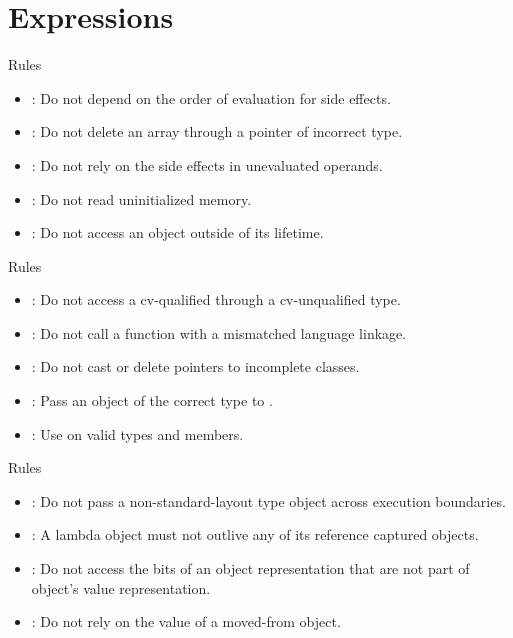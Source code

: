 \section{Expressions}

\begin{frame}[t]{Rules}
\begin{itemize}
  \item {}: 
        Do not depend on the order of evaluation for side effects.
  \vfill
  \item {}: 
        Do not delete an array through a pointer of incorrect type.
  \vfill
  \item {}: 
        Do not rely on the side effects in unevaluated operands.
  \vfill
  \item {}:
        Do not read uninitialized memory.
  \vfill
  \item {}:
        Do not access an object outside of its lifetime. 
\end{itemize}
\end{frame}

\begin{frame}[t]{Rules}
\begin{itemize}
  \item {}:
        Do not access a cv-qualified through a cv-unqualified type. 
  \vfill
  \item {}:
        Do not call a function with a mismatched language linkage. 
  \vfill
  \item {}: 
        Do not cast or delete pointers to incomplete classes.
  \vfill
  \item {}:
        Pass an object of the correct type to . 
  \vfill
  \item {}: 
        Use  on valid types and members.
\end{itemize}
\end{frame}

\begin{frame}[t]{Rules}
\begin{itemize}
  \item {}: 
        Do not pass a non-standard-layout type object across execution boundaries. 
  \vfill
  \item {}:
        A lambda object must not outlive any of its reference captured objects. 
  \vfill
  \item {}:
        Do not access the bits of an object representation that are not part
        of object's value representation. 
  \vfill
  \item {}: 
        Do not rely on the value of a moved-from object.
\end{itemize}
\end{frame}


